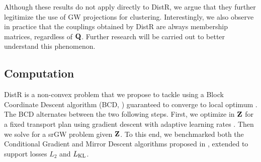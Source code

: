 Although these results do not apply directly to DistR, we argue that they further legitimize the use of GW projections for clustering. Interestingly, we also observe in practice that the couplings obtained by DistR are always membership matrices, regardless of ${\mathbf{Q}}$. Further research will be carried out to better understand this phenomenon. 


\subsection{Computation}\label{sec:computation_GW}

DistR is a non-convex problem that we propose to tackle using a Block Coordinate Descent algorithm (BCD, \citealt{tseng2001convergence}) guaranteed to converge to local optimum \citep{grippo2000convergence, Lyu2023bmm}. The BCD alternates between the two following steps. First, we optimize in ${\mathbf{Z}}$ for a fixed transport plan using gradient descent with adaptive learning rates \citep{kingma2014adam}. Then we solve for a srGW problem given ${\mathbf{Z}}$. To this end, we benchmarked both the Conditional Gradient and Mirror Descent algorithms proposed in \citet{vincent2021semi}, extended to support losses $L_2$ and $L_{\operatorname{KL}}$.

